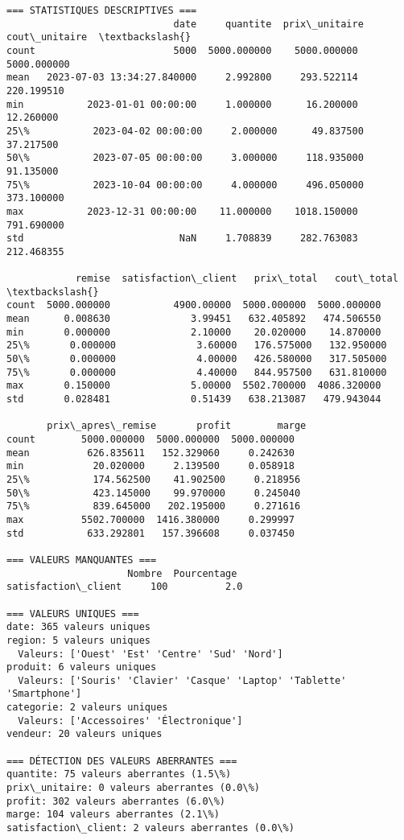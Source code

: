 \documentclass[11pt]{article}
\begin{document}
\begin{Verbatim}[commandchars=\\\{\}]
=== STATISTIQUES DESCRIPTIVES ===
                             date     quantite  prix\_unitaire  cout\_unitaire  \textbackslash{}
count                        5000  5000.000000    5000.000000    5000.000000
mean   2023-07-03 13:34:27.840000     2.992800     293.522114     220.199510
min           2023-01-01 00:00:00     1.000000      16.200000      12.260000
25\%           2023-04-02 00:00:00     2.000000      49.837500      37.217500
50\%           2023-07-05 00:00:00     3.000000     118.935000      91.135000
75\%           2023-10-04 00:00:00     4.000000     496.050000     373.100000
max           2023-12-31 00:00:00    11.000000    1018.150000     791.690000
std                           NaN     1.708839     282.763083     212.468355

            remise  satisfaction\_client   prix\_total   cout\_total  \textbackslash{}
count  5000.000000           4900.00000  5000.000000  5000.000000
mean      0.008630              3.99451   632.405892   474.506550
min       0.000000              2.10000    20.020000    14.870000
25\%       0.000000              3.60000   176.575000   132.950000
50\%       0.000000              4.00000   426.580000   317.505000
75\%       0.000000              4.40000   844.957500   631.810000
max       0.150000              5.00000  5502.700000  4086.320000
std       0.028481              0.51439   638.213087   479.943044

       prix\_apres\_remise       profit        marge
count        5000.000000  5000.000000  5000.000000
mean          626.835611   152.329060     0.242630
min            20.020000     2.139500     0.058918
25\%           174.562500    41.902500     0.218956
50\%           423.145000    99.970000     0.245040
75\%           839.645000   202.195000     0.271616
max          5502.700000  1416.380000     0.299997
std           633.292801   157.396608     0.037450

=== VALEURS MANQUANTES ===
                     Nombre  Pourcentage
satisfaction\_client     100          2.0

=== VALEURS UNIQUES ===
date: 365 valeurs uniques
region: 5 valeurs uniques
  Valeurs: ['Ouest' 'Est' 'Centre' 'Sud' 'Nord']
produit: 6 valeurs uniques
  Valeurs: ['Souris' 'Clavier' 'Casque' 'Laptop' 'Tablette' 'Smartphone']
categorie: 2 valeurs uniques
  Valeurs: ['Accessoires' 'Électronique']
vendeur: 20 valeurs uniques

=== DÉTECTION DES VALEURS ABERRANTES ===
quantite: 75 valeurs aberrantes (1.5\%)
prix\_unitaire: 0 valeurs aberrantes (0.0\%)
profit: 302 valeurs aberrantes (6.0\%)
marge: 104 valeurs aberrantes (2.1\%)
satisfaction\_client: 2 valeurs aberrantes (0.0\%)
    \end{Verbatim}
\end{document}
